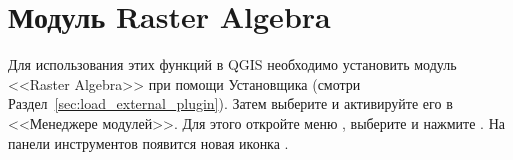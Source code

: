 
\section{Модуль Raster Algebra}\label{sec:ftools}



Для использования этих функций в QGIS необходимо установить модуль
<<Raster Algebra>> при помощи  Установщика
(смотри Раздел~\ref{sec:load_external_plugin}). Затем выберите и активируйте
его в <<Менеджере модулей>>. Для этого откройте меню  \arrow
{}, выберите  и
нажмите . На панели инструментов появится новая иконка
.

